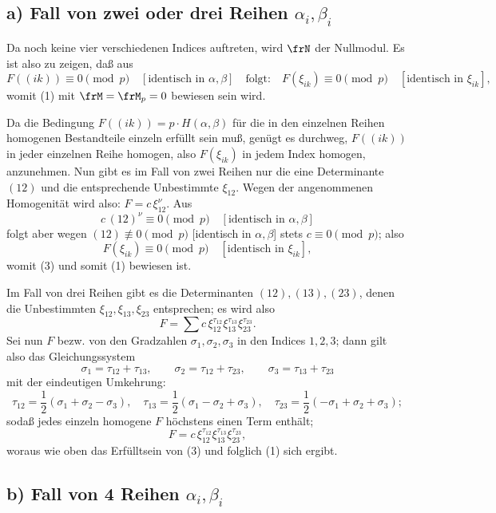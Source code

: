 \documentclass[11pt]{article}
\begin{document}
\subsection*{a) Fall von zwei oder drei Reihen \(\alpha_i,\beta_i\)}

Da noch keine vier verschiedenen Indices auftreten, wird \(\frN\) der Nullmodul. Es ist also zu zeigen, daß aus
\begin{equation}
        F((ik))\equiv0\pmod p\quad [\text{identisch in \(\alpha,\beta\)}]
        \quad\text{folgt:}\quad
        F(\xi_{ik})\equiv0\pmod p\quad [\text{identisch in \(\xi_{ik}\)}],
\end{equation}
womit (1) mit \(\frM=\frM_p=0\) bewiesen sein wird.

Da die Bedingung \(F((ik))=p\cdot H(\alpha,\beta)\) für die in den einzelnen Reihen homogenen Bestandteile einzeln erfüllt sein muß, genügt es durchweg, \(F((ik))\) in jeder einzelnen Reihe homogen, also \(F(\xi_{ik})\) in jedem Index homogen, anzunehmen. Nun gibt es im Fall von zwei Reihen nur die eine Determinante \((12)\) und die entsprechende Unbestimmte \(\xi_{12}\). Wegen der angenommenen Homogenität wird also: \(F=c\,\xi_{12}^\nu\). Aus
\[
        c\,(12)^\nu\equiv0\pmod p\quad[\text{identisch in \(\alpha,\beta\)}]
\]
folgt aber wegen \((12)\not\equiv0\pmod p\) [identisch in \(\alpha,\beta\)] stets \(c\equiv0\pmod p\); also
\[
        F(\xi_{ik})\equiv0\pmod p\quad [\text{identisch in \(\xi_{ik}\)}],
\]
womit (3) und somit (1) bewiesen ist.

Im Fall von drei Reihen gibt es die Determinanten \((12),(13),(23)\), denen die Unbestimmten \(\xi_{12},\xi_{13},\xi_{23}\) entsprechen; es wird also
\[
        F=\sum c\,\xi_{12}^{\tau_{12}}\xi_{13}^{\tau_{13}}\xi_{23}^{\tau_{23}}.
\]
Sei nun \(F\) bezw. von den Gradzahlen \(\sigma_1,\sigma_2,\sigma_3\) in den Indices \(1,2,3\); dann gilt also das Gleichungssystem
\[
        \sigma_1=\tau_{12}+\tau_{13},\qquad
        \sigma_2=\tau_{12}+\tau_{23},\qquad
        \sigma_3=\tau_{13}+\tau_{23}
\]
mit der eindeutigen Umkehrung:
\[
        \tau_{12}=\frac12(\sigma_1+\sigma_2-\sigma_3),\quad
        \tau_{13}=\frac12(\sigma_1-\sigma_2+\sigma_3),\quad
        \tau_{23}=\frac12(-\sigma_1+\sigma_2+\sigma_3);
\]
sodaß jedes einzeln homogene \(F\) höchstens einen Term enthält;
\[
        F=c\,\xi_{12}^{\tau_{12}}\xi_{13}^{\tau_{13}}\xi_{23}^{\tau_{23}},
\]
woraus wie oben das Erfülltsein von (3) und folglich (1) sich ergibt.

\subsection*{b) Fall von 4 Reihen \(\alpha_i,\beta_i\)}
\end{document}
